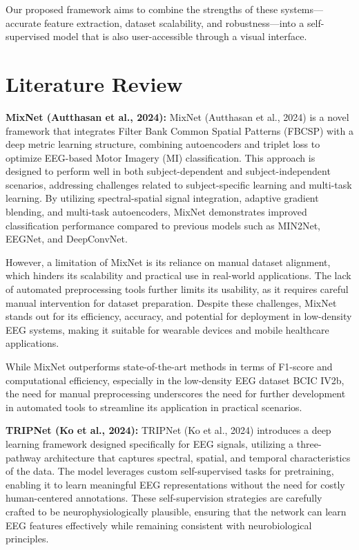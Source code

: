 \noindent
Our proposed framework aims to combine the strengths of these systems—accurate feature extraction, dataset scalability, and robustness—into a self-supervised model that is also user-accessible through a visual interface.

\section{Literature Review}
\label{sec:literature-review}

\textbf{MixNet (Autthasan et al., 2024):}
MixNet (Autthasan et al., 2024) is a novel framework that integrates Filter Bank Common Spatial Patterns (FBCSP) with a deep metric learning structure, combining autoencoders and triplet loss to optimize EEG-based Motor Imagery (MI) classification. This approach is designed to perform well in both subject-dependent and subject-independent scenarios, addressing challenges related to subject-specific learning and multi-task learning. By utilizing spectral-spatial signal integration, adaptive gradient blending, and multi-task autoencoders, MixNet demonstrates improved classification performance compared to previous models such as MIN2Net, EEGNet, and DeepConvNet.

However, a limitation of MixNet is its reliance on manual dataset alignment, which hinders its scalability and practical use in real-world applications. The lack of automated preprocessing tools further limits its usability, as it requires careful manual intervention for dataset preparation. Despite these challenges, MixNet stands out for its efficiency, accuracy, and potential for deployment in low-density EEG systems, making it suitable for wearable devices and mobile healthcare applications.

While MixNet outperforms state-of-the-art methods in terms of F1-score and computational efficiency, especially in the low-density EEG dataset BCIC IV2b, the need for manual preprocessing underscores the need for further development in automated tools to streamline its application in practical scenarios.

\vspace{0.5em}
\newpage
\textbf{TRIPNet (Ko et al., 2024):}
TRIPNet (Ko et al., 2024) introduces a deep learning framework designed specifically for EEG signals, utilizing a three-pathway architecture that captures spectral, spatial, and temporal characteristics of the data. The model leverages custom self-supervised tasks for pretraining, enabling it to learn meaningful EEG representations without the need for costly human-centered annotations. These self-supervision strategies are carefully crafted to be neurophysiologically plausible, ensuring that the network can learn EEG features effectively while remaining consistent with neurobiological principles.


